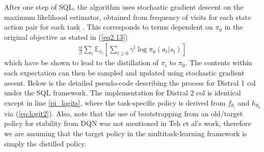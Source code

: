 \documentclass[12pt]{report}
\begin{document}
After one step of SQL, the algorithm uses stochastic gradient descent on the maximum likelihood estimator, obtained from frequency of visits for each state action pair for each task \cite{teh2017distral}. This corresponds to terms dependent on $\pi_0$ in the original objective as stated in (\ref{eq2.13})
\begin{align}
    \frac{\alpha}{\beta} \sum_i \mathbb{E}_{\pi_i} \left[\sum_{t\ge 0} \gamma^t \log \pi_0(a_t|s_t)\right] \label{eq2.24}
\end{align}
which have be shown \cite{hinton2015distilling} \cite{rusu2015policy} \cite{parisotto2015actor} to lead to the distillation of $\pi_i$ to $\pi_0$. The contents within each expectation can then be sampled and updated using stochastic gradient ascent. Below is the detailed pseudo-code describing the process for Distral 1 col under the SQL framework. The implementation for Distral 2 col is identical except in line \ref{pi_logits}, where the task-specific policy is derived from $f_{\theta_i}$ and $h_{\theta_0}$ via (\ref{eq:logit2}). Also, note that the use of bootstrapping from an old/target policy for stability from DQN \cite{mnih2013playing} was not mentioned in Teh et al's work, therefore we are assuming that the target policy in the multitask-learning framework is simply the distilled policy.
\end{document}
